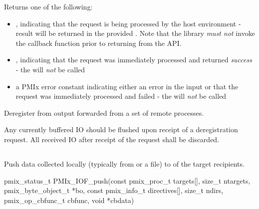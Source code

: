 Returns one of the following:

\begin{itemize}
    \item {}, indicating that the request is being processed by the host environment - result will be returned in the provided . Note that the library \emph{must not} invoke the callback function prior to returning from the \ac{API}.
    \item {}, indicating that the request was immediately processed and returned \textit{success} - the  will \textit{not} be called
    \item a PMIx error constant indicating either an error in the input or that the request was immediately processed and failed - the  will \textit{not} be called
\end{itemize}

\descr

Deregister from output forwarded from a set of remote processes.

\adviceimplstart
Any currently buffered \ac{IO} should be flushed upon receipt of a deregistration request. All received \ac{IO} after receipt of the request shall be discarded.
\adviceimplend


\subsection{}

\summary

Push data collected locally (typically from  or a file) to  of the target recipients.

\format

\cspecificstart
\begin{codepar}
pmix_status_t
PMIx_IOF_push(const pmix_proc_t targets[], size_t ntargets,
              pmix_byte_object_t *bo,
              const pmix_info_t directives[], size_t ndirs,
              pmix_op_cbfunc_t cbfunc, void *cbdata)
\end{codepar}
\cspecificend

\begin{arglist}
\end{arglist}

